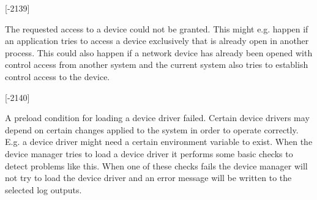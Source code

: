 \begin{Desc}
\begin{description}
{\bfseries }\mbox{[}-\/2139\mbox{]} \item[{\em 
\hypertarget{group___common_interface_gga112225e5fbaaaef6445ff4ebf98f8e03a8be3780ba3e27b29b95e565a370907b1}{D\+E\+V\+\_\+\+A\+C\+C\+E\+S\+S\+\_\+\+D\+E\+N\+I\+E\+D}\label{group___common_interface_gga112225e5fbaaaef6445ff4ebf98f8e03a8be3780ba3e27b29b95e565a370907b1}
}]The requested access to a device could not be granted. This might e.\+g. happen if an application tries to access a device exclusively that is already open in another process. This could also happen if a network device has already been opened with control access from another system and the current system also tries to establish control access to the device.

{\bfseries }\mbox{[}-\/2140\mbox{]} \item[{\em 
\hypertarget{group___common_interface_gga112225e5fbaaaef6445ff4ebf98f8e03ae1d6e436c68fecce5ff0ebeeb675cec0}{D\+M\+R\+\_\+\+P\+R\+E\+L\+O\+A\+D\+\_\+\+C\+H\+E\+C\+K\+\_\+\+F\+A\+I\+L\+E\+D}\label{group___common_interface_gga112225e5fbaaaef6445ff4ebf98f8e03ae1d6e436c68fecce5ff0ebeeb675cec0}
}]A preload condition for loading a device driver failed. Certain device drivers may depend on certain changes applied to the system in order to operate correctly. E.\+g. a device driver might need a certain environment variable to exist. When the device manager tries to load a device driver it performs some basic checks to detect problems like this. When one of these checks fails the device manager will not try to load the device driver and an error message will be written to the selected log outputs.


\end{description}
\end{Desc}
